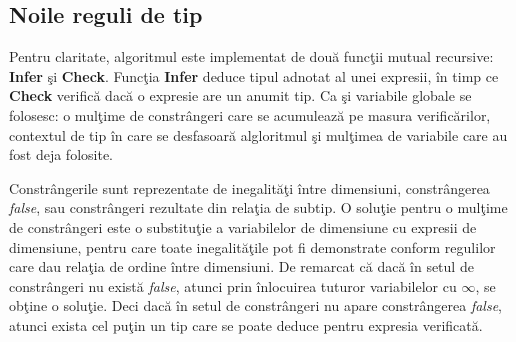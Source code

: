 \subsection{Noile reguli de tip}

Pentru claritate, algoritmul este implementat de dou\u a func\c tii mutual recursive: \textbf{Infer} \c si \textbf{Check}. Func\c tia \textbf{Infer} deduce tipul adnotat al unei expresii, \^ in timp ce \textbf{Check} verific\u a dac\u a o expresie are un anumit tip. Ca \c si variabile globale se folosesc: o mul\c time de constr\^ angeri care se acumuleaz\u a pe masura verific\u arilor, contextul de tip \^ in care se desfasoar\u a algloritmul \c si mul\c timea de variabile care au fost deja folosite.

Constr\^ angerile sunt reprezentate de inegalit\u a\c ti \^ intre dimensiuni, constr\^ angerea \emph{false}, sau constr\^ angeri rezultate din rela\c tia de subtip. O solu\c tie pentru o mul\c time de constr\^ angeri este o substitu\c tie a variabilelor de dimensiune cu expresii de dimensiune, pentru care toate inegalit\u a\c tile pot fi demonstrate conform regulilor care dau rela\c tia de ordine \^ intre dimensiuni. De remarcat c\u a dac\u a \^ in setul de constr\^ angeri nu exist\u a \emph{false}, atunci prin \^ inlocuirea tuturor variabilelor cu $\infty$, se ob\c tine o solu\c tie. Deci dac\u a \^ in setul de constr\^ angeri nu apare constr\^ angerea \emph{false}, atunci exista cel pu\c tin un tip care se poate deduce pentru expresia verificat\u a.

